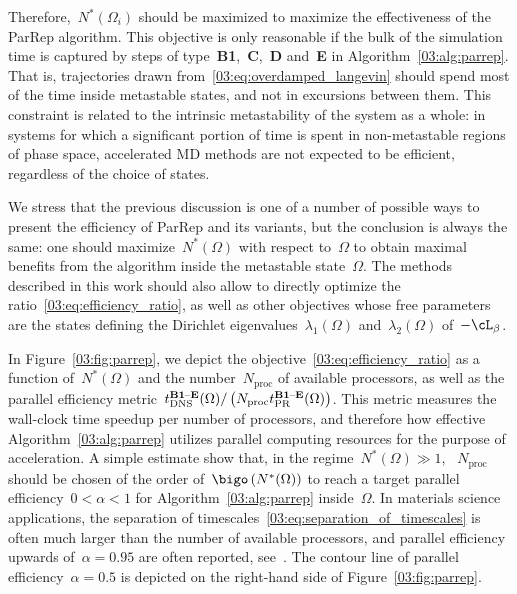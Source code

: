     Therefore,~$N^*(\Omega_i)$ should be maximized to maximize the effectiveness of the ParRep algorithm. This objective is only reasonable if the bulk of the simulation time is captured by steps of type~{\bf B1},~{\bf C},~{\bf D} and~{\bf E} in Algorithm~\ref{03:alg:parrep}.
    That is, trajectories drawn from~\eqref{03:eq:overdamped_langevin} should spend most of the time inside metastable states, and not in excursions between them. This constraint is related to the intrinsic metastability of the system as a whole: in systems for which a significant portion of time is spent in non-metastable regions of phase space, accelerated MD methods are not expected to be efficient, regardless of the choice of states.

    We stress that the previous discussion is one of a number of possible ways to present the efficiency of ParRep and its variants, but the conclusion is always the same: one should maximize~$N^*(\Omega)$ with respect to~$\Omega$ to obtain maximal benefits from the algorithm inside the metastable state~$\Omega$.
    The methods described in this work should also allow to directly optimize the ratio~\eqref{03:eq:efficiency_ratio}, as well as other objectives whose free parameters are the states defining the Dirichlet eigenvalues~$\lambda_1(\Omega)$ and~$\lambda_2(\Omega)$ of~$-\cL_\beta$.

    In Figure~\ref{03:fig:parrep}, we depict the objective~\eqref{03:eq:efficiency_ratio} as a function of~$N^*(\Omega)$ and the number~$N_{\mathrm{proc}}$ of available processors, as well as the parallel efficiency metric~$t_{\mathrm{DNS}}^{\text{{\bf B1}--{\bf E}}}(\Omega)/\left(N_{\mathrm{proc}}t_{\mathrm{PR}}^{\text{{\bf B1}--{\bf E}}}(\Omega)\right)$.
    This metric measures the wall-clock time speedup per number of processors, and therefore how effective Algorithm~\ref{03:alg:parrep} utilizes parallel computing resources for the purpose of acceleration. A simple estimate show that, in the regime~$N^*(\Omega)\gg 1$, ~$N_{\mathrm{proc}}$ should be chosen of the order of~$\bigo\left(N^*(\Omega)\right)$ to reach a target parallel efficiency~$0<\alpha<1$ for Algorithm~\ref{03:alg:parrep} inside~$\Omega$.
    In materials science applications, the separation of timescales~\eqref{03:eq:separation_of_timescales} is often much larger than the number of available processors, and parallel efficiency upwards of~$\alpha=0.95$ are often reported, see~\cite{PUV15}. The contour line of parallel efficiency~$\alpha=0.5$ is depicted on the right-hand side of Figure~\ref{03:fig:parrep}.
    
